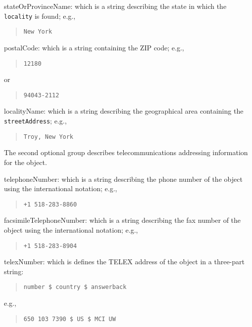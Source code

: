 \begin{describe}
\item[stateOrProvinceName:]
			which is a string describing the state in which
			the \verb"locality" is found; e.g.,
\begin{quote}\small\begin{verbatim}
New York
\end{verbatim}\end{quote}

\item[postalCode:]
			which is a string containing the ZIP code; e.g.,
\begin{quote}\small\begin{verbatim}
12180
\end{verbatim}\end{quote}
or
\begin{quote}\small\begin{verbatim}
94043-2112
\end{verbatim}\end{quote}

\item[localityName:]
			which is a string describing the geographical
			area containing the \verb"streetAddress"; e.g.,
\begin{quote}\small\begin{verbatim}
Troy, New York
\end{verbatim}\end{quote}
\end{describe}
The second optional group describes telecommunications addressing information
for the object.
\begin{describe}
\item[telephoneNumber:]
		which is a string describing the phone number of the object
		using the international notation; e.g.,
\begin{quote}\small\begin{verbatim}
+1 518-283-8860
\end{verbatim}\end{quote}

\item[facsimileTelephoneNumber:]
		which is a string describing the fax number of the object
		using the international notation; e.g.,
\begin{quote}\small\begin{verbatim}
+1 518-283-8904
\end{verbatim}\end{quote}

\item[telexNumber:]
		which is defines the TELEX address of the object in a
		three-part string:
\begin{quote}\small\begin{verbatim}
number $ country $ answerback
\end{verbatim}\end{quote}
		e.g.,
\begin{quote}\small\begin{verbatim}
650 103 7390 $ US $ MCI UW
\end{verbatim}\end{quote}
\end{describe}

